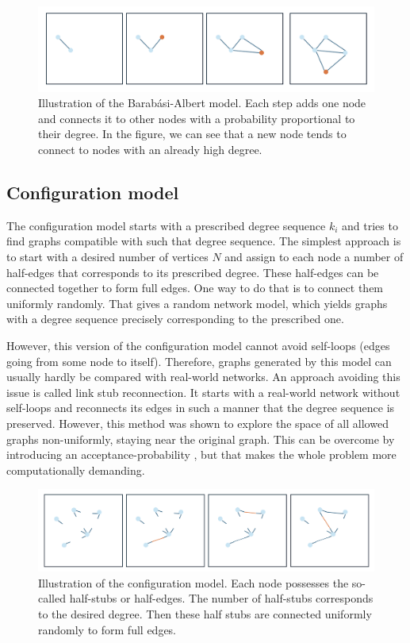 \begin{figure}[!ht]
\centering
\includegraphics[scale=0.55]{../img/theory/preferential_attachement.png}
    \caption{Illustration of the Barabási-Albert model. Each step adds one node and connects it to other nodes with a probability proportional to their degree. In the figure, we can see that a new node tends to connect to nodes with an already high degree.}
    \label{fig:barabasi_albert}
\end{figure}

\subsection{Configuration model}
The configuration model starts with a prescribed degree sequence ${k_i}$ and tries to find graphs compatible with such that degree sequence. The simplest approach is to start with a desired number of vertices $N$ and assign to each node a number of half-edges that corresponds to its prescribed degree. These half-edges can be connected together to form full edges. One way to do that is to connect them uniformly randomly. That gives a random network model, which yields graphs with a degree sequence precisely corresponding to the prescribed one.

However, this version of the configuration model cannot avoid self-loops (edges going from some node to itself). Therefore, graphs generated by this model can usually hardly be compared with real-world networks. An approach avoiding this issue is called link stub reconnection. It starts with a real-world network without self-loops and reconnects its edges in such a manner that the degree sequence is preserved. However, this method was shown to explore the space of all allowed graphs non-uniformly, staying near the original graph. This can be overcome by introducing an acceptance-probability \cite{Coolen2009}, but that makes the whole problem more computationally demanding.

\begin{figure}[!ht]
    \centering
    \includegraphics[scale=0.5]{../img/theory/configuration_model.png}
    \caption{Illustration of the configuration model. Each node possesses the so-called half-stubs or half-edges. The number of half-stubs corresponds to the desired degree. Then these half stubs are connected uniformly randomly to form full edges.}
    \label{fig:barabasi_albert}
\end{figure}


